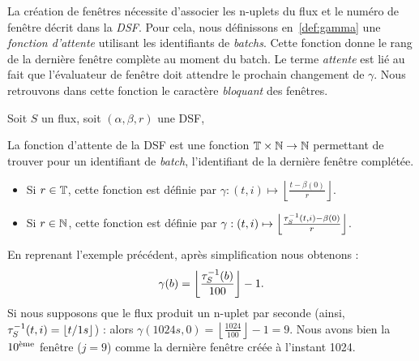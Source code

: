 La création de fenêtres nécessite d'associer les n-uplets du flux et le numéro de fenêtre décrit dans la \textit{DSF}. Pour cela, nous définissons en~\ref{def:gamma} une \textit{fonction d'attente} utilisant les identifiants de \textit{batchs}. Cette fonction donne le rang de la dernière fenêtre complète au moment du batch. Le terme \textit{attente} est lié au fait que l'évaluateur de fenêtre doit attendre le prochain changement de $\gamma$.
Nous retrouvons dans cette fonction le caractère \textit{bloquant} des fenêtres.
\begin{defi}\label{def:gamma}
    Soit $S$ un flux, soit $(\alpha,\beta,r)$ une DSF,

    La fonction d'attente de la DSF est une fonction $\mathbb{T}\times\mathbb{N} \to \mathbb{N}$ permettant de trouver pour un identifiant de \textit{batch}, l'identifiant de la dernière fenêtre complétée.
\begin{itemize}
 \item  Si $r\in\mathbb{T}$, cette fonction est définie par $\gamma : (t,i) \mapsto \left\lfloor \frac{t-\beta(0)}{r} \right\rfloor$.
 \item  Si $r\in\mathbb{N}$, cette fonction est définie par $\gamma : (t,i) \mapsto \left\lfloor \frac{\tau^{-1}_S(t,i)-\beta(0)}{r} \right\rfloor$.
\end{itemize}
\end{defi}
\begin{example}
    En reprenant l'exemple précédent, après simplification nous obtenons : $$\gamma(b) = \left\lfloor \frac{\tau^{-1}_S(b)}{100}\right\rfloor-1.$$
    Si nous supposons que le flux produit un n-uplet par seconde (ainsi, $\tau^{-1}_S(t,i) = \lfloor t/1s \rfloor$) : alors $\gamma(1024s,0) = \left\lfloor \frac{1024}{100}\right\rfloor-1 = 9$. Nous avons bien la $10^{\textrm{\`{e}me}}$ fenêtre ($j=9$) comme la dernière fenêtre créée à l'instant 1024.
\end{example}

